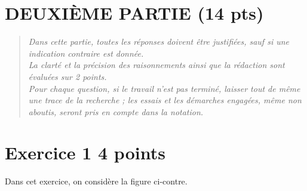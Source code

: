\documentclass[12pt,a4paper,french]{article}
\begin{document}
\newpage
\section*{\centering DEUXIÈME PARTIE (14 pts)}

\begin{quote}
\emph{Dans cette partie, toutes les réponses doivent être justifiées, sauf si une indication contraire est donnée.\\
	La clarté et la précision des raisonnements ainsi que la rédaction sont évaluées sur 2 points.\\
	Pour chaque question, si le travail n'est pas terminé, laisser tout de même une trace de la recherche ; les essais et les démarches engagées, même non aboutis, seront pris en compte dans la notation.}
	\end{quote}

\section*{Exercice 1 \hfill 4 points}

	Dans cet exercice, on considère la figure ci-contre.

	\medskip
\end{document}

